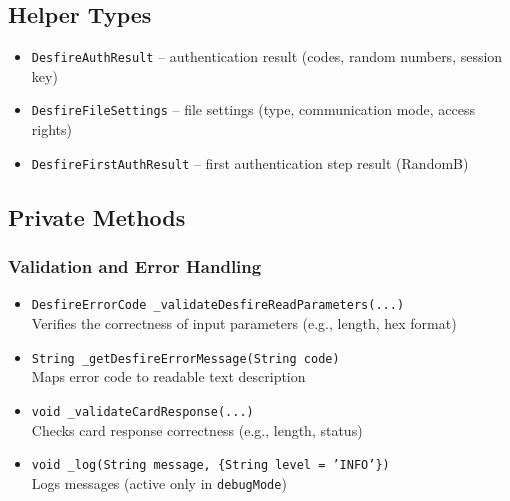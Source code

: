 \documentclass[a4paper,12pt]{article}
\begin{document}
\subsection{Helper Types}
\begin{itemize}
    \item \texttt{DesfireAuthResult} -- authentication result (codes, random numbers, session key)
    \item \texttt{DesfireFileSettings} -- file settings (type, communication mode, access rights)
    \item \texttt{DesfireFirstAuthResult} -- first authentication step result (RandomB)
\end{itemize}

\subsection{Private Methods}

\subsubsection*{Validation and Error Handling}
\begin{itemize}
    \item \texttt{DesfireErrorCode \_validateDesfireReadParameters(...)}\\
    Verifies the correctness of input parameters (e.g., length, hex format)
    
    \item \texttt{String \_getDesfireErrorMessage(String code)}\\
    Maps error code to readable text description
    
    \item \texttt{void \_validateCardResponse(...)}\\
    Checks card response correctness (e.g., length, status)
    
    \item \texttt{void \_log(String message, \{String level = 'INFO'\})}\\
    Logs messages (active only in \texttt{debugMode})
\end{itemize}
\end{document}

